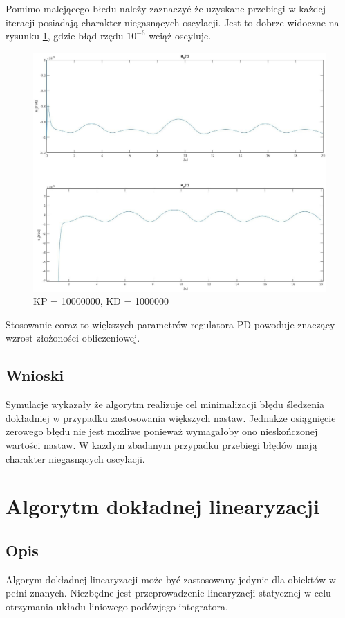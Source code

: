 \documentclass[12pt,a4paper]{article}
\begin{document}
    Pomimo malejącego błedu należy zaznaczyć że uzyskane przebiegi w każdej iteracji posiadają charakter niegasnących oscylacji. Jest to dobrze widoczne na rysunku \ref{fig:10000000}, gdzie błąd rzędu $10^{-6}$ wciąż oscyluje.

  \begin{figure}[H]
    \centering
    \includegraphics[height=0.45\textheight]{figures/qui10000000_2.jpg}
    \caption{KP = 10000000, KD = 1000000}
    \label{fig:10000000}
  \end{figure}

    Stosowanie coraz to większych parametrów regulatora PD powoduje znaczący wzrost złożoności obliczeniowej.

  \subsection{Wnioski}
    Symulacje wykazały że algorytm realizuje cel minimalizacji błędu śledzenia dokładniej w przypadku zastosowania większych nastaw. Jednakże osiągnięcie zerowego błędu nie jest możliwe ponieważ wymagałoby ono nieskończonej wartości nastaw. W każdym zbadanym przypadku przebiegi błędów mają charakter niegasnących oscylacji.


\section{Algorytm dokładnej linearyzacji}
  \subsection{Opis} %
    Algorym dokładnej linearyzacji może być zastosowany jedynie dla obiektów w pełni znanych. Niezbędne jest przeprowadzenie linearyzacji statycznej w celu otrzymania układu liniowego podówjego integratora.
\end{document}
